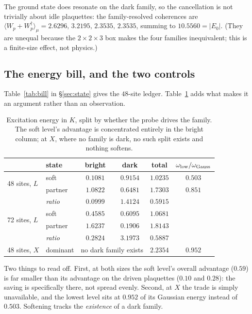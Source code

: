 \documentclass[11pt]{article}
\newcommand{\Wp}{W_p}
\newcommand{\Wpd}{W_p^{\dagger}}
\begin{document}
\noindent
The ground state does resonate on the dark family, so the cancellation
is not trivially about idle plaquettes: the family-resolved coherences
are $\langle\Wp+\Wpd\rangle_\mu=2.6296,\,3.2195,\,2.3535,\,2.3535$,
summing to $10.5560=|E_0|$. (They are unequal because the
$2\times2\times3$ box makes the four families inequivalent; this is a
finite-size effect, not physics.)

\subsection{The energy bill, and the two controls}

Table~\ref{tab:bill} in \S\ref{sec:state} gives the $48$-site ledger.
Table~\ref{tab:controls} adds what makes it an argument rather than an
observation.

\begin{table}[h]
\centering
\caption{Excitation energy in $K$, split by whether the probe drives the
family. The soft level's advantage is concentrated entirely in the
bright column; at $X$, where no family is dark, no such split exists and
nothing softens.}
\label{tab:controls}
\begin{tabular}{llccc c}
\toprule
& state & bright & dark & total & $\omega_{\rm low}/\omega_{\rm Gauss}$\\
\midrule
\multirow{2}{*}{48 sites, $L$}
 & soft    & $0.1081$ & $0.9154$ & $1.0235$ & $0.503$\\
 & partner & $1.0822$ & $0.6481$ & $1.7303$ & $0.851$\\
 & \emph{ratio} & $\bm{0.0999}$ & $1.4124$ & $0.5915$ &\\
\midrule
\multirow{2}{*}{72 sites, $L$}
 & soft    & $0.4585$ & $0.6095$ & $1.0681$ &\\
 & partner & $1.6237$ & $0.1906$ & $1.8143$ &\\
 & \emph{ratio} & $\bm{0.2824}$ & $3.1973$ & $0.5887$ &\\
\midrule
48 sites, $X$ & dominant & \multicolumn{2}{c}{no dark family exists}
 & $2.2354$ & $0.952$\\
\bottomrule
\end{tabular}
\end{table}

\noindent
Two things to read off. First, at both sizes the soft level's overall
advantage ($0.59$) is far smaller than its advantage on the driven
plaquettes ($0.10$ and $0.28$): the saving is specifically there, not
spread evenly. Second, at $X$ the trade is simply unavailable, and the
lowest level sits at $0.952$ of its Gaussian energy instead of $0.503$.
Softening tracks the \emph{existence} of a dark family.
\end{document}
